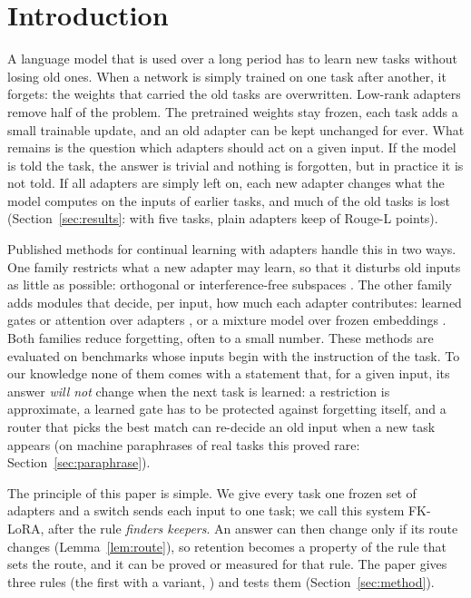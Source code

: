 \section{Introduction}
\label{sec:intro}

A language model that is used over a long period has to learn new tasks without losing old ones.
When a network is simply trained on one task after another, it forgets: the weights that carried the
old tasks are overwritten. Low-rank adapters \citep{hu2022lora} remove half of the problem. The
pretrained weights stay frozen, each task adds a small trainable update, and an old adapter can be
kept unchanged for ever. What remains is the question which adapters should act on a given input.
If the model is told the task, the answer is trivial and nothing is forgotten, but in practice it is
not told. If all adapters are simply left on, each new adapter changes what the model computes on
the inputs of earlier tasks, and much of the old tasks is lost
(Section~\ref{sec:results}: with five tasks, plain adapters keep \FivePlainAP{} of \FivePlainLearned{}
Rouge-L points).

Published methods for continual learning with adapters handle this in two ways. One family
restricts what a new adapter may learn, so that it disturbs old inputs as little as possible:
orthogonal or interference-free subspaces \citep{wang2023olora,liang2024inflora,spacelora2026}. The
other family adds modules that decide, per input, how much each adapter contributes: learned gates
or attention over adapters \citep{liang2025gainlora,zhao2024sapt}, or a mixture model over frozen
embeddings \citep{latentlora2026}. Both families reduce forgetting, often to a small number. These
methods are evaluated on benchmarks whose inputs begin with the instruction of the task. To our
knowledge none of them comes with a statement that, for a given input, its answer \emph{will not}
change when the next task is learned: a restriction is approximate, a learned gate has to be
protected against forgetting itself, and a router that picks the best match can re-decide an old
input when a new task appears (on machine paraphrases of real tasks this proved rare:
Section~\ref{sec:paraphrase}).

The principle of this paper is simple. We give every task one frozen set of adapters and a switch
sends each input to one task; we call this system FK-LoRA, after the rule \emph{finders keepers}. An answer can then change only if its route changes
(Lemma~\ref{lem:route}), so retention becomes a property of the rule that sets the route, and it
can be proved or measured for that rule. The paper gives three rules (the first with a variant,
\handicap{}) and tests them
(Section~\ref{sec:method}).

